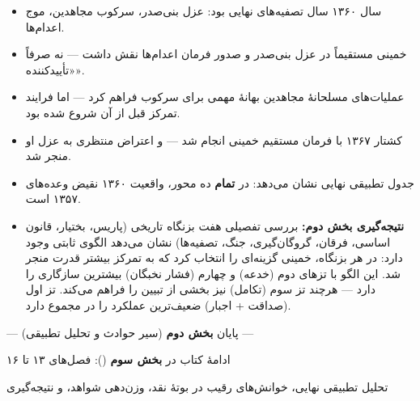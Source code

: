 \documentclass[12pt,a4paper]{book}
\newcommand{\keyword}[1]{\textbf{\textcolor{cPrimary}{#1}}}
\newcommand{\en}[1]{\lr{\textit{#1}}}
\begin{document}
\begin{principleBox}
\begin{itemize}[label=\textcolor{cPrimary}{$\blacksquare$}, rightmargin=2em]
    \item سال ۱۳۶۰ سال تصفیه‌های نهایی بود: عزل بنی‌صدر، سرکوب مجاهدین، موج اعدام‌ها.
    \item خمینی مستقیماً در عزل بنی‌صدر و صدور فرمان اعدام‌ها نقش داشت — نه صرفاً «تأییدکننده».
    \item عملیات‌های مسلحانهٔ مجاهدین بهانهٔ مهمی برای سرکوب فراهم کرد — اما فرایند تمرکز قبل از آن شروع شده بود.
    \item کشتار ۱۳۶۷ با فرمان مستقیم خمینی انجام شد — و اعتراض منتظری به عزل او منجر شد.
    \item جدول تطبیقی نهایی نشان می‌دهد: در \keyword{تمام} ده محور، واقعیت ۱۳۶۰ نقیض وعده‌های ۱۳۵۷ است.
    \item \keyword{نتیجه‌گیری بخش دوم:} بررسی تفصیلی هفت بزنگاه تاریخی (پاریس، بختیار، قانون اساسی، فرقان، گروگان‌گیری، جنگ، تصفیه‌ها) نشان می‌دهد الگوی ثابتی وجود دارد: در هر بزنگاه، خمینی گزینه‌ای را انتخاب کرد که به تمرکز بیشتر قدرت منجر شد. این الگو با تزهای دوم (خدعه) و چهارم (فشار نخبگان) بیشترین سازگاری را دارد — هرچند تز سوم (تکامل) نیز بخشی از تبیین را فراهم می‌کند. تز اول (صداقت + اجبار) ضعیف‌ترین عملکرد را در مجموع دارد.
\end{itemize}
\end{principleBox}

\vspace{1cm}

\begin{center}

\vspace{0.5cm}
{\small\color{cGray} — پایان \textbf{بخش دوم} (سیر حوادث و تحلیل تطبیقی) —}

\vspace{0.3cm}
{\small\color{cGray} ادامهٔ کتاب در \textbf{بخش سوم} (\en{Segment 4}): فصل‌های ۱۳ تا ۱۶}

\vspace{0.2cm}
{\small\color{cGray} تحلیل تطبیقی نهایی، خوانش‌های رقیب در بوتهٔ نقد، وزن‌دهی شواهد، و نتیجه‌گیری}
\end{center}

\end{document}
